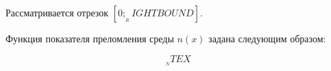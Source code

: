 Рассматривается отрезок $[0; __RIGHTBOUND]$.

Функция показателя преломления среды $n(x)$ задана следующим
образом:

\begin{equation*}
__NTEX
\end{equation*}